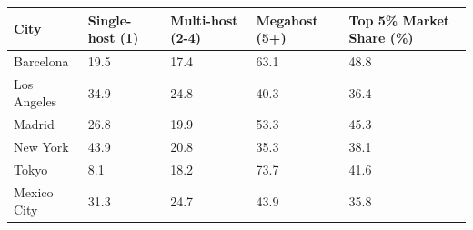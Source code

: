\begin{tabular}{lllll}
\toprule
City & Single-host (1) & Multi-host (2-4) & Megahost (5+) & Top 5\% Market Share (\%) \\
\midrule
Barcelona & 19.5 & 17.4 & 63.1 & 48.8 \\
Los Angeles & 34.9 & 24.8 & 40.3 & 36.4 \\
Madrid & 26.8 & 19.9 & 53.3 & 45.3 \\
New York & 43.9 & 20.8 & 35.3 & 38.1 \\
Tokyo & 8.1 & 18.2 & 73.7 & 41.6 \\
Mexico City & 31.3 & 24.7 & 43.9 & 35.8 \\
\bottomrule
\end{tabular}
